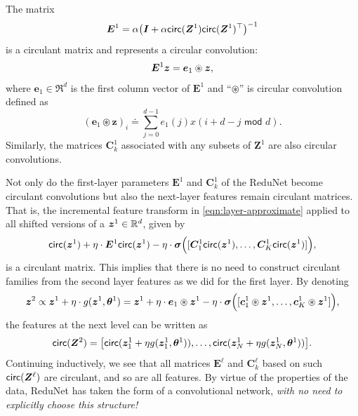 \documentclass[../../book-main.tex]{subfiles}
\begin{document}
\begin{proposition}
The matrix 
\begin{equation}
    \bm E^1 = \alpha\big(\bm I + \alpha \mathsf{circ}(\bm Z^1) \mathsf{circ}(\bm Z^1)^\top \big)^{-1}
\end{equation}
is a circulant matrix and represents a circular convolution: 
$$\bm E^1 \bm{z} = \bm e_1 \circledast \bm{z},$$ 
where $\bm e_1 \in \Re^d$ is the first column vector of $\bm E^1$ and ``$\circledast$'' is circular convolution defined as
\begin{equation*}
    (\bm e_1 \circledast \bm z)_{i} \doteq \sum_{j=0}^{d-1} e_1(j) x(i+ d-j \,\, \textsf{mod} \,\,d).
\end{equation*}
Similarly, the matrices $\bm C^1_k$ associated with any subsets of $\bm Z^1$ are also circular convolutions. 
\label{prop:circular-conv-1}
\end{proposition}

Not only do the first-layer parameters $\bm E^1$ and $\bm{C}^1_k$ of the ReduNet become circulant convolutions but also the next-layer features remain circulant matrices. 
That is, the incremental feature transform in \eqref{eqn:layer-approximate} applied to all shifted versions of a $\bm{z}^1 \in \mathbb{R}^d$, given by
\begin{equation}
    \mathsf{circ}(\bm{z}^1) + \eta \cdot \bm E^1 \mathsf{circ}(\bm{z}^1) - \eta \cdot \bm \sigma \Big([\bm{C}_1^1 \mathsf{circ}(\bm{z}^1), \ldots, \bm{C}^1_K \mathsf{circ}(\bm{z}^1)] \Big),
\end{equation}
is a circulant matrix.  This implies that there is no need to construct circulant families from the second layer features as we did for the first layer. 
By denoting
\begin{equation}
\bm{z}^{2} \propto \bm{z}^{1} +\eta \cdot g(\bm{z}^{1}, \bm \theta^{1}) =  \bm{z}^1 + \eta \cdot \bm e_{1} \circledast \bm{z}^{1} -  \eta \cdot \bm \sigma\Big([\bm{c}_{1}^{1} \circledast \bm{z}^{1}, \dots, \bm{c}^{1}_{K} \circledast \bm{z}^{1}]\Big),
\label{eqn:approximate-convolution}
\end{equation}
the features at the next level can be written as
$$\mathsf{circ}(\bm Z^2) = \big[ \mathsf{circ}( \bm z_{1}^1 + \eta g( \bm z_{1}^1, \bm \theta^1)), \dots, \mathsf{circ}( \bm z_{N}^1 + \eta g(\bm z_{N}^1, \bm \theta^1)) \big].$$
Continuing inductively, we see that all matrices $\bm E^\ell$ and $\bm C^\ell_k$ based on such $\mathsf{circ}(\bm Z^\ell)$ are circulant, and so are all features. 
By virtue of the properties of the data, ReduNet has taken the form of a convolutional network, {\em with no need to explicitly choose this structure!} 
\end{document}
